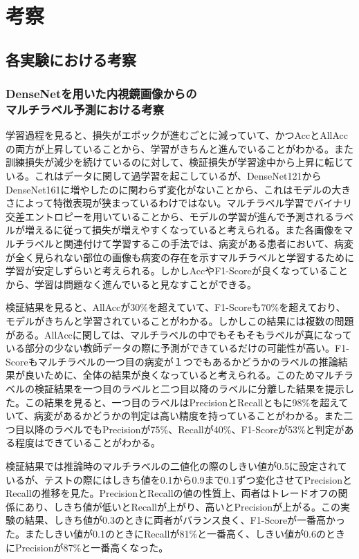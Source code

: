 \section{考察}
\subsection{各実験における考察}
\subsubsection{DenseNetを用いた内視鏡画像からの\\マルチラベル予測における考察}
学習過程を見ると、損失がエポックが進むごとに減っていて、かつAccとAllAccの両方が上昇していることから、学習がきちんと進んでいることがわかる。また訓練損失が減少を続けているのに対して、検証損失が学習途中から上昇に転じている。これはデータに関して過学習を起こしているが、DenseNet121からDenseNet161に増やしたのに関わらず変化がないことから、これはモデルの大きさによって特徴表現が狭まっているわけではない。マルチラベル学習でバイナリ交差エントロピーを用いていることから、モデルの学習が進んで予測されるラベルが増えるに従って損失が増えやすくなっていると考えられる。また各画像をマルチラベルと関連付けて学習するこの手法では、病変がある患者において、病変が全く見られない部位の画像も病変の存在を示すマルチラベルと学習するために学習が安定しずらいと考えられる。しかしAccやF1-Scoreが良くなっていることから、学習は問題なく進んでいると見なすことができる。

検証結果を見ると、AllAccが30\%を超えていて、F1-Scoreも70\%を超えており、モデルがきちんと学習されていることがわかる。しかしこの結果には複数の問題がある。AllAccに関しては、マルチラベルの中でもそもそもラベルが真になっている部分の少ない教師データの際に予測ができているだけの可能性が高い。F1-Scoreもマルチラベルの一つ目の病変が１つでもあるかどうかのラベルの推論結果が良いために、全体の結果が良くなっていると考えられる。このためマルチラベルの検証結果を一つ目のラベルと二つ目以降のラベルに分離した結果を提示した。この結果を見ると、一つ目のラベルはPrecisionとRecallともに98\%を超えていて、病変があるかどうかの判定は高い精度を持っていることがわかる。また二つ目以降のラベルでもPrecisionが75\%、Recallが40\%、F1-Scoreが53\%と判定がある程度はできていることがわかる。

検証結果では推論時のマルチラベルの二値化の際のしきい値が0.5に設定されているが、テストの際にはしきち値を0.1から0.9まで0.1ずつ変化させてPrecisionとRecallの推移を見た。PrecisionとRecallの値の性質上、両者はトレードオフの関係にあり、しきち値が低いとRecallが上がり、高いとPrecisionが上がる。この実験の結果、しきち値が0.3のときに両者がバランス良く、F1-Scoreが一番高かった。またしきい値が0.1のときにRecallが81\%と一番高く、しきい値が0.6のときにPrecisionが87\%と一番高くなった。

